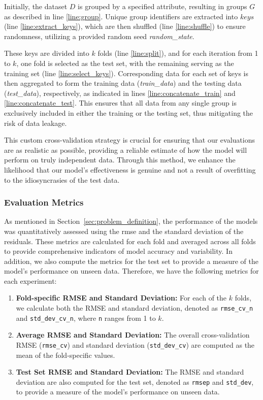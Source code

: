 Initially, the dataset \(D\) is grouped by a specified attribute, resulting in groups \(G\) as described in line \ref{line:group}.
Unique group identifiers are extracted into \(keys\) (line \ref{line:extract_keys}), which are then shuffled (line \ref{line:shuffle}) to ensure randomness, utilizing a provided random seed \textit{random\_state}.

These keys are divided into \(k\) folds (line \ref{line:split}), and for each iteration from 1 to \(k\), one fold is selected as the test set, with the remaining serving as the training set (line \ref{line:select_keys}).
Corresponding data for each set of keys is then aggregated to form the training data (\textit{train\_data}) and the testing data (\textit{test\_data}), respectively, as indicated in lines \ref{line:concatenate_train} and \ref{line:concatenate_test}.
This ensures that all data from any single group is exclusively included in either the training or the testing set, thus mitigating the risk of data leakage.

This custom cross-validation strategy is crucial for ensuring that our evaluations are as realistic as possible, providing a reliable estimate of how the model will perform on truly independent data.
Through this method, we enhance the likelihood that our model's effectiveness is genuine and not a result of overfitting to the idiosyncrasies of the test data.


\subsubsection{Evaluation Metrics}
As mentioned in Section~\ref{sec:problem_definition}, the performance of the models was quantitatively assessed using the \gls{rmse} and the standard deviation of the residuals.
These metrics are calculated for each fold and averaged across all folds to provide comprehensive indicators of model accuracy and variability.
In addition, we also compute the metrics for the test set to provide a measure of the model's performance on unseen data.
Therefore, we have the following metrics for each experiment:
\begin{enumerate}
    \item \textbf{Fold-specific RMSE and Standard Deviation:} For each of the $k$ folds, we calculate both the RMSE and standard deviation, denoted as \texttt{rmse\_cv\_n} and \texttt{std\_dev\_cv\_n}, where \texttt{n} ranges from 1 to $k$.
    \item \textbf{Average RMSE and Standard Deviation:} The overall cross-validation RMSE (\texttt{rmse\_cv}) and standard deviation (\texttt{std\_dev\_cv}) are computed as the mean of the fold-specific values.
    \item \textbf{Test Set RMSE and Standard Deviation:} The RMSE and standard deviation are also computed for the test set, denoted as \texttt{rmsep} and \texttt{std\_dev}, to provide a measure of the model's performance on unseen data.
\end{enumerate}


